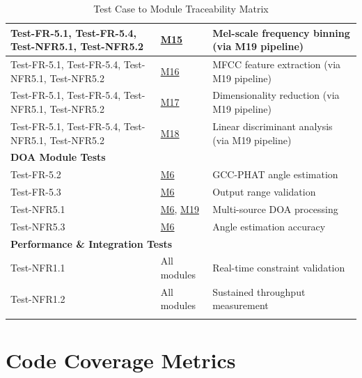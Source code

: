 \documentclass[12pt, titlepage]{article}
\begin{document}
{\begin{longtable}{|p{2.5cm}|p{3cm}|p{8cm}|}
\\
\hline
Test-FR-5.1, \newline
Test-FR-5.4, \newline
Test-NFR5.1, \newline
Test-NFR5.2 & \hyperref[MG-mMelFilter]{M15} &
Mel-scale frequency binning (via M19 pipeline) \\
\hline
Test-FR-5.1, \newline
Test-FR-5.4, \newline
Test-NFR5.1, \newline
Test-NFR5.2 & \hyperref[MG-mDCT]{M16} &
MFCC feature extraction (via M19 pipeline) \\
\hline
Test-FR-5.1, \newline
Test-FR-5.4, \newline
Test-NFR5.1, \newline
Test-NFR5.2 & \hyperref[MG-mPCA]{M17} &
Dimensionality reduction (via M19 pipeline) \\
\hline
Test-FR-5.1, \newline
Test-FR-5.4, \newline
Test-NFR5.1, \newline
Test-NFR5.2 & \hyperref[MG-mLDA]{M18} &
Linear discriminant analysis (via M19 pipeline) \\
\hline
\hline
\multicolumn{3}{|l|}{\textbf{DOA Module Tests}} \\
\hline
Test-FR-5.2 & \hyperref[MG-mDOA]{M6} & GCC-PHAT angle estimation \\
\hline
Test-FR-5.3 & \hyperref[MG-mDOA]{M6} & Output range validation \\
\hline
Test-NFR5.1 & \hyperref[MG-mDOA]{M6}, \hyperref[MG-mClassification]{M19} &
Multi-source DOA processing \\
\hline
Test-NFR5.3 & \hyperref[MG-mDOA]{M6} & Angle estimation accuracy \\
\hline
\hline
\multicolumn{3}{|l|}{\textbf{Performance \& Integration Tests}} \\
\hline
Test-NFR1.1 & All modules & Real-time constraint validation \\
\hline
Test-NFR1.2 & All modules & Sustained throughput measurement \\
\hline
\caption{Test Case to Module Traceability Matrix}
\label{TblModuleTrace}
\end{longtable}

\section{Code Coverage Metrics}

}
\end{document}

